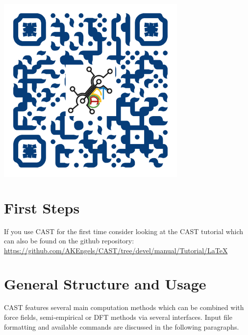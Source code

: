 \documentclass[10pt,a4paper]{article} %
\begin{document}
	\begin{center}
		\includegraphics[width=0.7\textwidth]{img/qr-code}
	\end{center}
	

	\newpage
	
	\section{First Steps}
	
	If you use \ac{CAST} for the first time consider looking at the CAST tutorial which can also be found on the github repository:\\ \url{https://github.com/AKEngels/CAST/tree/devel/manual/Tutorial/LaTeX}

	\newpage

	\section{General Structure and Usage}
	\ac{CAST} features several main computation methods which can be combined with force fields, semi-empirical or \ac{DFT} methods via several interfaces. Input file formatting and available commands are discussed in the following paragraphs.


\end{document}
